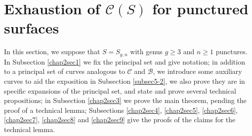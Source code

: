 \documentclass[twoside,11pt,a4paper]{article}
\newcommand*{\ccomp}[1]{\mathcal{C}(#1)}
\newcommand*{\Cf}{\mathscr{C}}
\newcommand*{\Bf}{\mathscr{B}}
\begin{document}
\section{Exhaustion of $\ccomp{S}$ for punctured surfaces}\label{chap2}
\indent In this section, we suppose that $S = S_{g,n}$ with genus $g \geq 3$ and $n \geq 1$ punctures. In Subsection \ref{chap2sec1} we fix the principal set and give notation; in addition to a principal set of curves analogous to $\Cf$ and $\Bf$, we introduce some auxiliary curves to aid the exposition in Subsection \ref{subsec5-2}, we also prove they are in specific expansions of the principal set, and state and prove several technical propositions; in Subsection \ref{chap2sec3} we prove the main theorem, pending the proof of a technical lemma; Subsections \ref{chap2sec4}, \ref{chap2sec5}, \ref{chap2sec6}, \ref{chap2sec7}, \ref{chap2sec8} and \ref{chap2sec9} give the proofs of the claims for the technical lemma.
\end{document}

